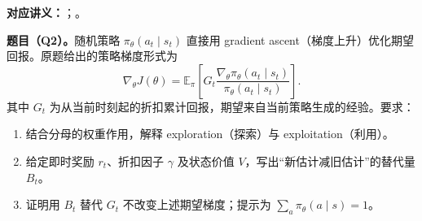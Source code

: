 
\textbf{对应讲义：}；。

\textbf{题目（Q2）。}随机策略 $\pi_\theta(a_t\mid s_t)$ 直接用 gradient ascent（梯度上升）优化期望回报。原题给出的策略梯度形式为
\[
 \nabla_\theta J(\theta)=\mathbb E_\pi\!\left[
 G_t\frac{\nabla_\theta\pi_\theta(a_t\mid s_t)}{\pi_\theta(a_t\mid s_t)}
 \right].
\]
其中 $G_t$ 为从当前时刻起的折扣累计回报，期望来自当前策略生成的经验。要求：
\begin{enumerate}[label=(\alph*)]
 \item 结合分母的权重作用，解释 exploration（探索）与 exploitation（利用）。
 \item 给定即时奖励 $r_t$、折扣因子 $\gamma$ 及状态价值 $V$，写出“新估计减旧估计”的替代量 $B_t$。
 \item 证明用 $B_t$ 替代 $G_t$ 不改变上述期望梯度；提示为 $\sum_a\pi_\theta(a\mid s)=1$。
\end{enumerate}

